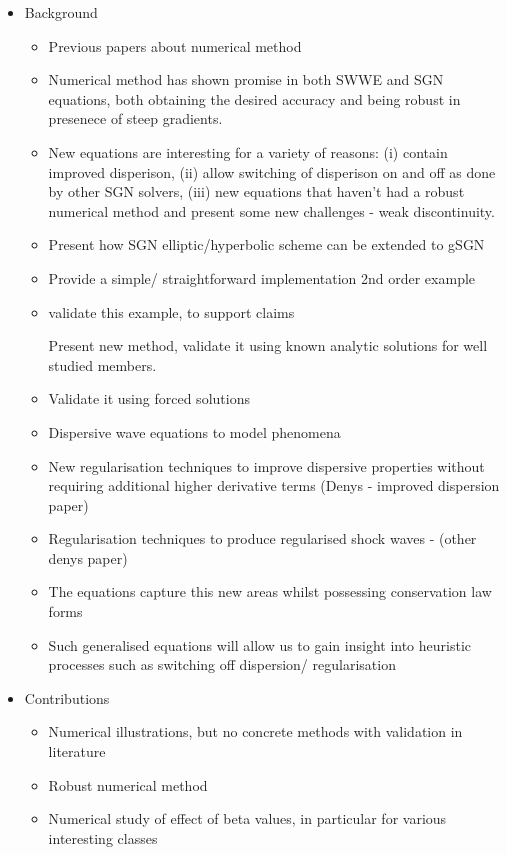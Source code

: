 \documentclass[10pt]{elsarticle}
\begin{document}
\begin{itemize}
	\item Background
	\begin{itemize}
		\item Previous papers about numerical method
		\item Numerical method has shown promise in both SWWE and SGN equations, both obtaining the desired accuracy and being robust in presenece of steep gradients.
		\item New equations are interesting for a variety of reasons: (i) contain improved disperison, (ii) allow switching of disperison on and off as done by other SGN solvers, (iii) new equations that haven't had a robust numerical method and present some new challenges - weak discontinuity.
		\item Present how SGN elliptic/hyperbolic scheme can be extended to gSGN
		\item Provide a simple/ straightforward implementation 2nd order example
		\item validate this example, to support claims
		
		Present new method, validate it using known analytic solutions for well studied members.
		\item Validate it using forced solutions
		
		\item Dispersive wave equations to model phenomena
		\item New regularisation techniques to improve dispersive properties without requiring additional higher derivative terms (Denys - improved dispersion paper)
		\item Regularisation techniques to produce regularised shock waves - (other denys paper)
		\item The equations capture this new areas whilst possessing conservation law forms
		\item Such generalised equations will allow us to gain insight into heuristic processes such as switching off dispersion/ regularisation
	\end{itemize}
\item Contributions
\begin{itemize}
	\item Numerical illustrations, but no concrete methods with validation in literature
	\item Robust numerical method
	\item Numerical study of effect of beta values, in particular for various interesting classes
\end{itemize}
\end{itemize}
\end{document}
